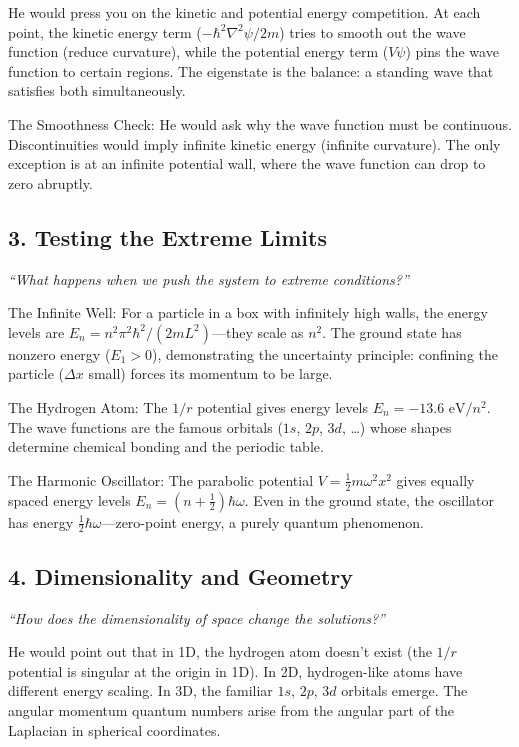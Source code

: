 He would press you on the kinetic and potential energy competition. At each point, the kinetic energy term ($-\hbar^2\nabla^2\psi/2m$) tries to smooth out the wave function (reduce curvature), while the potential energy term ($V\psi$) pins the wave function to certain regions. The eigenstate is the balance: a standing wave that satisfies both simultaneously.

The Smoothness Check: He would ask why the wave function must be continuous. Discontinuities would imply infinite kinetic energy (infinite curvature). The only exception is at an infinite potential wall, where the wave function can drop to zero abruptly.

\subsection*{3. Testing the Extreme Limits}
\textit{``What happens when we push the system to extreme conditions?''}

The Infinite Well: For a particle in a box with infinitely high walls, the energy levels are $E_n = n^2 \pi^2 \hbar^2 / (2mL^2)$---they scale as $n^2$. The ground state has nonzero energy ($E_1 > 0$), demonstrating the uncertainty principle: confining the particle ($\Delta x$ small) forces its momentum to be large.

The Hydrogen Atom: The $1/r$ potential gives energy levels $E_n = -13.6 \text{ eV}/n^2$. The wave functions are the famous orbitals ($1s$, $2p$, $3d$, \ldots) whose shapes determine chemical bonding and the periodic table.

The Harmonic Oscillator: The parabolic potential $V = \frac{1}{2}m\omega^2 x^2$ gives equally spaced energy levels $E_n = (n + \frac{1}{2})\hbar\omega$. Even in the ground state, the oscillator has energy $\frac{1}{2}\hbar\omega$---zero-point energy, a purely quantum phenomenon.

\subsection*{4. Dimensionality and Geometry}
\textit{``How does the dimensionality of space change the solutions?''}

He would point out that in 1D, the hydrogen atom doesn't exist (the $1/r$ potential is singular at the origin in 1D). In 2D, hydrogen-like atoms have different energy scaling. In 3D, the familiar $1s$, $2p$, $3d$ orbitals emerge. The angular momentum quantum numbers arise from the angular part of the Laplacian in spherical coordinates.

